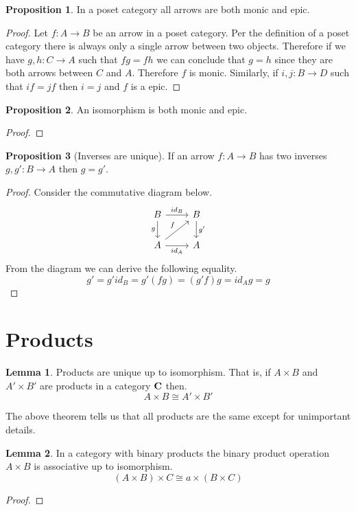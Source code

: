\documentclass{article}
\theoremstyle{definition}
\newtheorem{proposition}{Proposition}
\newtheorem{lemma}{Lemma}
\newcommand{\arr}[3]{#1 : #2 \rightarrow #3}
\newcommand\id{\mathit{id}}
\begin{document}
\begin{proposition}
  In a poset category all arrows are both monic and epic.
\end{proposition}
\begin{proof}
  Let $\arr{f}{A}{B}$ be an arrow in a poset category. Per the definition of a
  poset category there is always only a single arrow between two objects.
  Therefore if we have $\arr{g, h}{C}{A}$ such that $fg = fh$ we can conclude
  that $g = h$ since they are both arrows between $C$ and $A$. Therefore $f$ is
  monic. Similarly, if $\arr{i, j}{B}{D}$ such that $if = jf$ then $i = j$ and
  $f$ is a epic.
\end{proof}

\begin{proposition}
  An isomorphism is both monic and epic.
\end{proposition}
\begin{proof}

\end{proof}

\begin{proposition}[Inverses are unique]
  If an arrow $\arr{f}{A}{B}$ has two inverses $\arr{g, g'}{B}{A}$ then $g =
  g'$.
\end{proposition}
\begin{proof}
  Consider the commutative diagram below.
  \[
    \begin{tikzcd}
      B \arrow[r, "id_B"] \arrow[d, "g"'] & B \arrow[d, "g'"] \\
      A \arrow[r, "id_A"'] \arrow[ru, "f"] & A
    \end{tikzcd}
  \]
  From the diagram we can derive the following equality.
  \[
    g' = g' \id_B = g' (f g) = (g' f) g = \id_A g = g
  \]
\end{proof}

\section{Products}

\begin{lemma}
  Products are unique up to isomorphism. That is, if $A \times B$ and $A' \times
  B'$ are products in a category $\bf{C}$ then.
  $$
  A \times B \cong A' \times B'
  $$
\end{lemma}

The above theorem tells us that all products are the same except for unimportant
details.

\begin{lemma}
  In a category with binary products the binary product operation $A \times B$
  is associative up to isomorphism.
  \[
    (A \times B) \times C \cong a \times (B \times C)
  \]
\end{lemma}
\begin{proof}

\end{proof}
\end{document}
